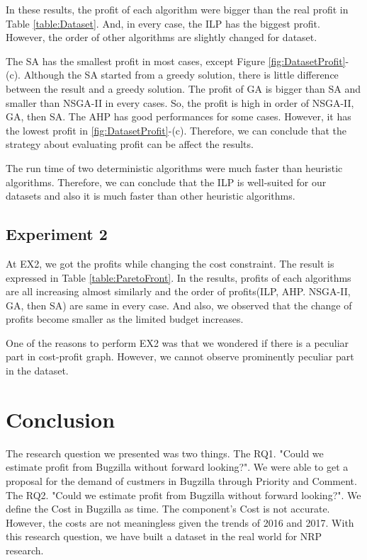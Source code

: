In these results, the profit of each algorithm were bigger than the real profit in Table \ref{table:Dataset}. And, in every case, the ILP has the biggest profit. However, the order of other algorithms are slightly changed for dataset.

The SA has the smallest profit in most cases, except Figure \ref{fig:DatasetProfit}-(c). Although the SA started from a greedy solution, there is little difference between the result and a greedy solution. The profit of GA is bigger than SA and smaller than NSGA-II in every cases. So, the profit is high in order of NSGA-II, GA, then SA. The AHP has good performances for some cases. However, it has the lowest profit in \ref{fig:DatasetProfit}-(c). Therefore, we can conclude that the strategy about evaluating profit can be affect the results.

The run time of two deterministic algorithms were much faster than heuristic algorithms. Therefore, we can conclude that the ILP is well-suited for our datasets and also it is much faster than other heuristic algorithms.

\subsection{Experiment 2}

At EX2, we got the profits while changing the cost constraint. The result is expressed in Table \ref{table:ParetoFront}. In the results, profits of each algorithms are all increasing almost similarly and the order of profits(ILP, AHP. NSGA-II, GA, then SA) are same in every case. And also, we observed that the change of profits become smaller as the limited budget increases.

One of the reasons to perform EX2 was that we wondered if there is a peculiar part in cost-profit graph. However, we cannot observe prominently peculiar part in the dataset.


\section{Conclusion}
The research question we presented was two things.
The RQ1. "Could we estimate profit from Bugzilla without forward looking?". We were able to get a proposal for the demand of custmers in Bugzilla through Priority and Comment. The RQ2. "Could we estimate profit from Bugzilla without forward looking?". We define the Cost in Bugzilla as time. The component's Cost is not accurate. However, the costs are not meaningless given the trends of 2016 and 2017. With this research question, we have built a dataset in the real world for NRP research.

